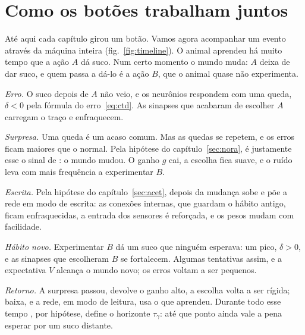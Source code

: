 \section{Como os botões trabalham juntos}

Até aqui cada capítulo girou um botão. Vamos agora acompanhar um evento através da máquina inteira (fig.~\ref{fig:timeline}). O animal aprendeu há muito tempo que a ação $A$ dá suco. Num certo momento o mundo muda: $A$ deixa de dar suco, e quem passa a dá-lo é a ação $B$, que o animal quase não experimenta.

\emph{Erro.} O suco depois de $A$ não veio, e os neurônios  respondem com uma queda, $\delta<0$ pela fórmula do erro~\eqref{eq:ctd}. As sinapses que acabaram de escolher $A$ carregam o traço e enfraquecem.

\emph{Surpresa.} Uma queda é um acaso comum. Mas as quedas se repetem, e os erros ficam maiores que o normal. Pela hipótese do capítulo~\ref{sec:nora}, é justamente esse o sinal de : o mundo mudou. O ganho $g$ cai, a escolha fica suave, e o ruído leva com mais frequência a experimentar $B$.

\emph{Escrita.} Pela hipótese do capítulo~\ref{sec:acet}, depois da mudança  sobe e põe a rede em modo de escrita: as conexões internas, que guardam o hábito antigo, ficam enfraquecidas, a entrada dos sensores é reforçada, e os pesos mudam com facilidade.

\emph{Hábito novo.} Experimentar $B$ dá um suco que ninguém esperava: um pico, $\delta>0$, e as sinapses que escolheram $B$ se fortalecem. Algumas tentativas assim, e a expectativa $V$ alcança o mundo novo; os erros voltam a ser pequenos.

\emph{Retorno.} A surpresa passou,  devolve o ganho alto, a escolha volta a ser rígida;  baixa, e a rede, em modo de leitura, usa o que aprendeu. Durante todo esse tempo , por hipótese, define o horizonte $\tau_\gamma$: até que ponto ainda vale a pena esperar por um suco distante.

